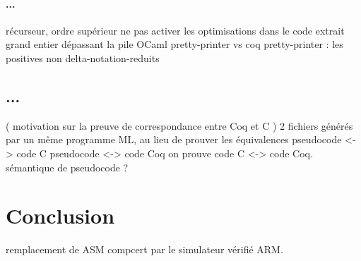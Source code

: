 \documentclass[a4paper, 11pt]{article}
\newcommand{\CCasm}{$_{\tt compcert}{\tt ASM}$\xspace}
\newcommand{\C}{$_{\tt compcert}{\tt C}$\xspace}
\begin{document}

\paragraph{...}
récurseur, ordre supérieur
ne pas activer les optimisations dans le code extrait
grand entier dépassant la pile OCaml
pretty-printer vs coq pretty-printer : les positives non delta-notation-reduits
\subsection{...}
  ( motivation sur la preuve de correspondance entre Coq et C )
  2 fichiers générés par un même programme ML, au lieu de prouver les équivalences 
  pseudocode <-> code C
  pseudocode <-> code Coq
  on prouve code C <-> code Coq. sémantique de pseudocode ?

\section{Conclusion}
remplacement de ASM compcert par le simulateur vérifié ARM.
\end{document}
